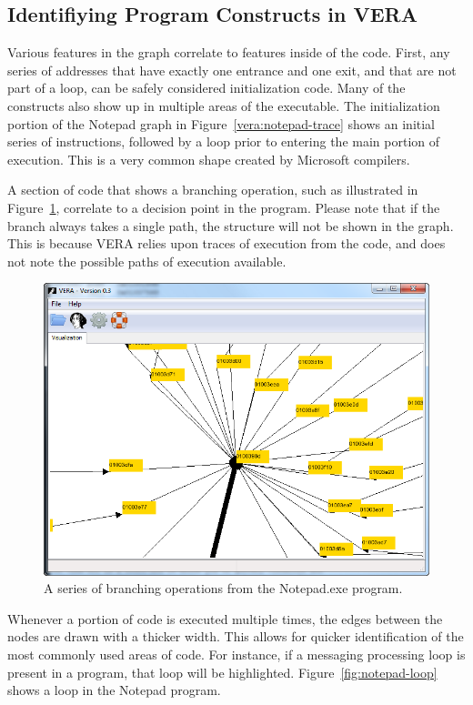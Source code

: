 \documentclass[11pt]{article}
\begin{document}
\subsection{Identifiying Program Constructs in VERA}

Various features in the graph correlate to features inside of the
code. First, any series of addresses that have exactly one entrance
and one exit, and that are not part of a loop, can be safely
considered initialization code. Many of the constructs also show up in
multiple areas of the executable. The initialization portion of the
Notepad graph in Figure~\ref{vera:notepad-trace} shows an initial
series of instructions, followed by a loop prior to entering the main
portion of execution. This is a very common shape created by
Microsoft compilers. 

A section of code that shows a branching operation, such as
illustrated in Figure~\ref{fig:notepad-branch}, correlate to a decision
point in the program. Please note that if the branch always takes a
single path, the structure will not be shown in the graph. This is
because VERA relies upon traces of execution from the code, and does
not note the possible paths of execution available.

\begin{figure}[htb]
  \centering
  \includegraphics[width=5.0in]{vera-notepad-trace-zoom3.png}
  \caption{A series of branching operations from the Notepad.exe program.}\label{fig:notepad-branch}
\end{figure}

Whenever a portion of code is executed multiple times, the edges
between the nodes are drawn with a thicker width. This allows for
quicker identification of the most commonly used areas of code. For
instance, if a messaging processing loop is present in a program, that
loop will be highlighted. Figure~\ref{fig:notepad-loop} shows a loop
in the Notepad program.
\end{document}
